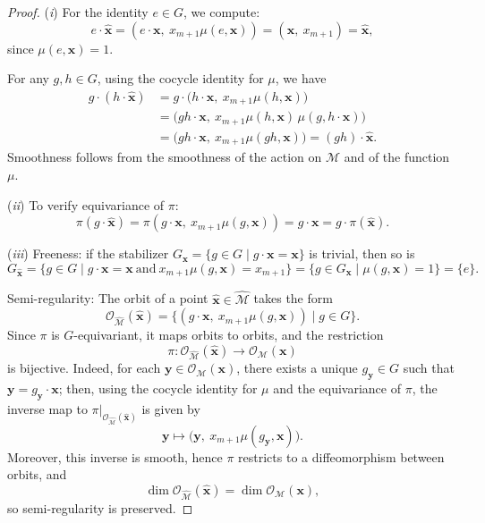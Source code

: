 \documentclass[10pt,a4paper]{amsart}
\begin{document}
\begin{proof}
(\textit{i}) For the identity $e \in G$, we compute:
$$
e \cdot \boldsymbol{\hat x}
= (e \cdot \boldsymbol x,\ x_{m+1} \mu(e,\boldsymbol x))
= (\boldsymbol x,\ x_{m+1}) = \boldsymbol{\hat x},
$$
since $\mu(e, \boldsymbol x) = 1$.

For any $g,h \in G$, using the cocycle identity for $\mu$, we have
\begin{align*}
g \cdot (h \cdot \boldsymbol{\hat x})
&= g \cdot \bigl(h \cdot \boldsymbol x,\ x_{m+1} \mu(h,\boldsymbol x)\bigr) \\
&= \bigl(gh \cdot \boldsymbol x,\ x_{m+1} \mu(h,\boldsymbol x)\, \mu(g, h \cdot \boldsymbol x)\bigr) \\
&= \bigl(gh \cdot \boldsymbol x,\ x_{m+1} \mu(gh,\boldsymbol x)\bigr)
= (gh) \cdot \boldsymbol{\hat x}.
\end{align*}
Smoothness follows from the smoothness of the action on $\mathcal M$ and of the function $\mu$.

\medskip

(\textit{ii}) To verify equivariance of $\pi$:
$$
\pi(g \cdot \boldsymbol{\hat x}) = \pi(g \cdot \boldsymbol x,\ x_{m+1} \mu(g,\boldsymbol x)) = g \cdot \boldsymbol x = g \cdot \pi(\boldsymbol{\hat x}).
$$

\medskip

(\textit{iii}) Freeness: if the stabilizer $G_{\boldsymbol x} = \{ g \in G \mid g \cdot \boldsymbol x = \boldsymbol x \}$ is trivial, then so is
\[
G_{\boldsymbol{\hat x}} = \{ g \in G \mid g \cdot \boldsymbol x = \boldsymbol x \ \text{and} \ x_{m+1} \mu(g, \boldsymbol x) = x_{m+1} \}
= \{ g \in G_{\boldsymbol x} \mid \mu(g,\boldsymbol x) = 1 \} = \{e\}.
\]

\medskip

Semi-regularity: The orbit of a point $\boldsymbol{\hat x} \in \widehat{\mathcal M}$ takes the form
\[
\mathcal O_{\widehat{\mathcal M}}(\boldsymbol{\hat x})
= \{ (g \cdot \boldsymbol x,\ x_{m+1} \mu(g,\boldsymbol x)) \mid g \in G \}.
\]
Since $\pi$ is $G$-equivariant, it maps orbits to orbits, and the restriction
\[
\pi : \mathcal O_{\widehat{\mathcal M}}(\boldsymbol{\hat x}) \to \mathcal O_{\mathcal M}(\boldsymbol x)
\]
is bijective. Indeed, for each $\boldsymbol y \in \mathcal O_{\mathcal M}(\boldsymbol x)$, there exists a unique $g_{\boldsymbol y} \in G$ such that $\boldsymbol y = g_{\boldsymbol y} \cdot \boldsymbol x$; then, using the cocycle identity for $\mu$ and the equivariance of $\pi$, the inverse map to $\pi|_{\mathcal O_{\widehat{\mathcal M}}(\boldsymbol{\hat x})}$ is given by
\[
\boldsymbol y \mapsto \bigl(\boldsymbol y,\ x_{m+1} \mu(g_{\boldsymbol y}, \boldsymbol x)\bigr).
\]
Moreover, this inverse is smooth, hence $\pi$ restricts to a diffeomorphism between orbits, and
\[
\dim \mathcal O_{\widehat{\mathcal M}}(\boldsymbol{\hat x}) = \dim \mathcal O_{\mathcal M}(\boldsymbol x),
\]
so semi-regularity is preserved.


\end{proof}
\end{document}
